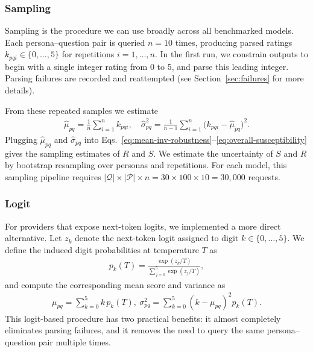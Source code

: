 \documentclass{article}
\begin{document}
\subsubsection{Sampling}

Sampling is the procedure we can use broadly across all benchmarked models. Each persona--question pair is queried \(n=10\) times, producing parsed ratings \(k_{pqi}\in\{0,\ldots,5\}\) for repetitions \(i=1,\ldots,n\). In the first run, we constrain outputs to begin with a single integer rating from 0 to 5, and parse this leading integer. Parsing failures are recorded and reattempted (see Section~\ref{sec:failures} for more details).

From these repeated samples we estimate
\begin{align}
  \hat{\mu}_{pq} = \frac{1}{n} \sum_{i=1}^{n} k_{pqi},\quad \hat{\sigma}_{pq}^2 = \frac{1}{n-1} \sum_{i=1}^{n} \big(k_{pqi} - \hat{\mu}_{pq}\big)^2.
\end{align}
Plugging \(\hat{\mu}_{pq}\) and \(\hat{\sigma}_{pq}\) into Eqs.~\eqref{eq:mean-inv-robustness}--\eqref{eq:overall-susceptibility} gives the sampling estimates of \(R\) and \(S\). We estimate the uncertainty of \(S\) and \(R\) by bootstrap resampling over personas and repetitions. For each model, this sampling pipeline requires $|\mathcal{Q}|\times|\mathcal{P}|\times n =30\times 100\times 10=30,000$ requests.

\subsubsection{Logit}
\label{sec:logit}

For providers that expose next-token logits, we implemented a more direct alternative. Let \(z_k\) denote the next-token logit assigned to digit \(k\in\{0,\ldots,5\}\). We define the induced digit probabilities at temperature $T$ as
\begin{align}
  p_k(T) = \frac{\exp(z_k/T)}{\sum_{j=0}^5 \exp(z_j/T)},
  \label{eq:probabilities}
\end{align}
and compute the corresponding mean score and variance as
\begin{align}
  \mu_{pq} = \sum_{k=0}^5 k\, p_k(T), \ \sigma_{pq}^2 = \sum_{k=0}^5 (k-\mu_{pq})^2 p_k(T).
\end{align}
This logit-based procedure has two practical benefits: it almost completely eliminates parsing failures, and it removes the need to query the same persona--question pair multiple times. 
\end{document}
